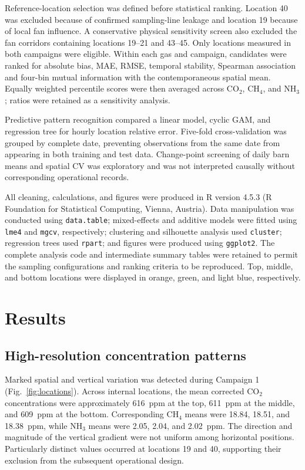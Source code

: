 \documentclass[12pt,a4paper]{article}
\begin{document}
Reference-location selection was defined before statistical ranking. Location
40 was excluded because of confirmed sampling-line leakage and location 19
because of local fan influence. A conservative physical sensitivity screen
also excluded the fan corridors containing locations 19--21 and 43--45. Only
locations measured in both campaigns were eligible. Within each gas and
campaign, candidates were ranked for absolute bias, MAE, RMSE, temporal
stability, Spearman association and four-bin mutual information with the
contemporaneous spatial mean. Equally weighted percentile scores were then
averaged across \(\mathrm{CO_2}\), \(\mathrm{CH_4}\), and
\(\mathrm{NH_3}\); ratios were retained as a sensitivity analysis.

Predictive pattern recognition compared a linear model, cyclic GAM, and
regression tree for hourly location relative error. Five-fold cross-validation
was grouped by complete date, preventing observations from the same date from
appearing in both training and test data. Change-point screening of daily barn
means and spatial CV was exploratory and was not interpreted causally without
corresponding operational records.

All cleaning, calculations, and figures were produced in R version 4.5.3
(R Foundation for Statistical Computing, Vienna, Austria). Data manipulation
was conducted using \texttt{data.table}; mixed-effects and additive models
were fitted using \texttt{lme4} and \texttt{mgcv}, respectively; clustering
and silhouette analysis used \texttt{cluster}; regression trees used
\texttt{rpart}; and figures were produced using \texttt{ggplot2}. The complete
analysis code and intermediate summary tables were retained to permit the
sampling configurations and ranking criteria to be reproduced. Top, middle,
and bottom locations were displayed in orange, green, and light blue,
respectively.

\section{Results}

\subsection{High-resolution concentration patterns}

Marked spatial and vertical variation was detected during Campaign 1
(Fig.~\ref{fig:locations}). Across internal locations, the mean corrected
\(\mathrm{CO_2}\) concentrations were approximately \SI{616}{ppm} at the top,
\SI{611}{ppm} at the middle, and \SI{609}{ppm} at the bottom.
Corresponding \(\mathrm{CH_4}\) means were 18.84, 18.51, and
\SI{18.38}{ppm}, while \(\mathrm{NH_3}\) means were 2.05, 2.04, and
\SI{2.02}{ppm}. The direction and magnitude of the vertical gradient were not
uniform among horizontal positions. Particularly distinct values occurred at
locations 19 and 40, supporting their exclusion from the subsequent
operational design.
\end{document}
